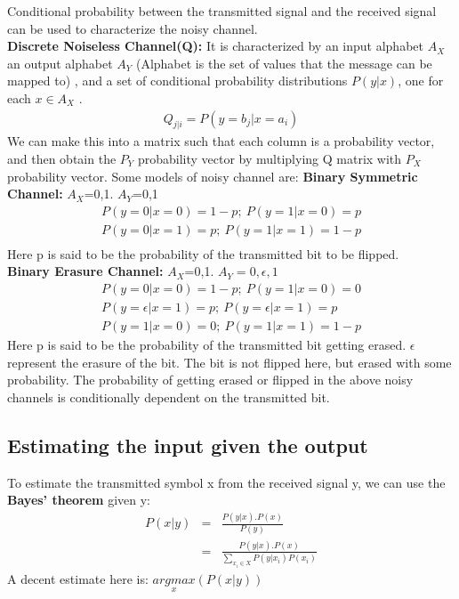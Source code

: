 \documentclass[10pt,twocolumn,letterpaper]{article}
\begin{document}
Conditional probability between the transmitted signal and the received signal can be used to characterize the noisy channel.\\
\textbf{Discrete Noiseless Channel(Q):}
It is characterized by an input alphabet $A_X$ an output alphabet $A_Y$ (Alphabet is the set of values that the message can be mapped to) , and a set of conditional probability distributions $P(y |x)$, one for each $x\in A_X$ .
\begin{eqnarray*}
    Q_{j|i}=P(y=b_j|x=a_i)
\end{eqnarray*}
We can make this into a matrix such that each column is a probability vector, and then obtain the $P_Y$ probability vector by multiplying Q matrix with $P_X$ probability vector.
Some models of noisy channel are:
\textbf{Binary Symmetric Channel:} $A_X$={0,1}. $A_Y$={0,1}
\begin{eqnarray*}
P(y=0|x=0)=1-p;\ P(y=1|x=0)=p\\
P(y= 0|x= 1)=p;\ P(y= 1|x=1) = 1-p\\
\end{eqnarray*}
Here p is said to be the probability of the transmitted bit to be flipped.\\
\textbf{Binary Erasure Channel:} $A_X$={0,1}. $A_Y={0,\epsilon,1}$
\begin{eqnarray*}
P(y=0|x=0)=1-p;\ P(y=1|x=0)=0\\
P(y= \epsilon|x= 1)=p;\ P(y= \epsilon|x=1)= p\\
P(y=1|x=0)=0;\ P(y=1|x=1)=1-p
\end{eqnarray*}
Here p is said to be the probability of the transmitted bit getting erased. $\epsilon$ represent the erasure of the bit. The bit is not flipped here, but erased with some probability.
The probability of getting erased or flipped in the above noisy channels is conditionally dependent on the transmitted bit.

\subsection{Estimating the input given the output}
To estimate the transmitted symbol x from the received signal y, we can use the \textbf{Bayes' theorem} given y:
\begin{eqnarray*}
P(x|y)&=&\frac{P(y|x).P(x)}{P(y)}\\
&=&\frac{P(y|x).P(x)}{\sum_{x_i\in X}P(y|x_i)P(x_i)}
\end{eqnarray*}
A decent estimate here is: $\underset{x}{argmax}(P(x|y))$
\end{document}
